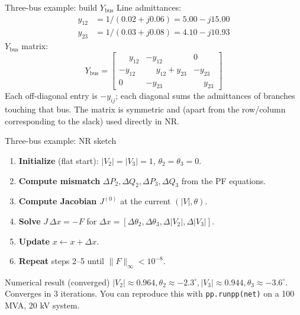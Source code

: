 \documentclass[aspectratio=169,10pt]{beamer}
\newcommand{\code}[1]{\texttt{#1}}
\begin{document}
\begin{frame}{Three-bus example: build $Y_{\text{bus}}$}
Line admittances:
\begin{align*}
y_{12} &= 1/(0.02 + j0.06) = 5.00 - j15.00 \\
y_{23} &= 1/(0.03 + j0.08) = 4.10 - j10.93
\end{align*}
$Y_{\text{bus}}$ matrix:
\begin{equation*}
Y_{\text{bus}} = \begin{bmatrix}
\phantom{-}y_{12}            & -y_{12}        & 0 \\
-y_{12}        & \phantom{-}y_{12}+y_{23}  & -y_{23} \\
0              & -y_{23}        & \phantom{-}y_{23}
\end{bmatrix}
\end{equation*}
Each off-diagonal entry is $-y_{ij}$; each diagonal sums the admittances of branches touching that bus. The matrix is symmetric and (apart from the row/column corresponding to the slack) used directly in NR.
\end{frame}

\begin{frame}{Three-bus example: NR sketch}
\begin{enumerate}
  \item \textbf{Initialize} (flat start): $|V_2| = |V_3| = 1$, $\theta_2 = \theta_3 = 0$.
  \item \textbf{Compute mismatch} $\Delta P_2, \Delta Q_2, \Delta P_3, \Delta Q_3$ from the PF equations.
  \item \textbf{Compute Jacobian} $J^{(0)}$ at the current $(|V|, \theta)$.
  \item \textbf{Solve} $J \, \Delta x = -F$ for $\Delta x = [\Delta\theta_2, \Delta\theta_3, \Delta|V_2|, \Delta|V_3|]$.
  \item \textbf{Update} $x \leftarrow x + \Delta x$.
  \item \textbf{Repeat} steps 2--5 until $\| F \|_\infty < 10^{-8}$.
\end{enumerate}
\vspace{0.5em}
\begin{block}{Numerical result (converged)}
$|V_2| \approx 0.964, \theta_2 \approx -2.3^\circ, |V_3| \approx 0.944, \theta_3 \approx -3.6^\circ$. Converges in 3 iterations. You can reproduce this with \code{pp.runpp(net)} on a 100 MVA, 20 kV system.
\end{block}
\end{frame}
\end{document}
